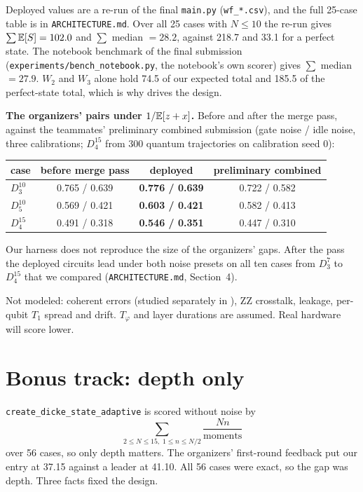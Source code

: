 \documentclass[11pt]{scrartcl}
\newcommand{\D}[2]{D^{#1}_{#2}}
\newcommand{\file}[1]{\texttt{\small #1}}
\begin{document}
Deployed values are a re-run of the final \file{main.py} (\file{wf\_*.csv}), and the full 25-case
table is in \file{ARCHITECTURE.md}. Over all 25 cases with $N\le10$ the re-run gives
$\sum\mathbb E[S]=102.0$ and $\sum$ median $=28.2$, against 218.7 and 33.1 for a perfect state. The
notebook benchmark of the final submission (\file{experiments/bench\_notebook.py}, the notebook's
own scorer) gives $\sum$ median $=27.9$. $W_2$ and $W_3$ alone hold 74.5 of our expected total and
185.5 of the perfect-state total, which is why  drives the design.

\textbf{The organizers' pairs under $1/\mathbb E[z+x]$.} Before and after the merge pass, against the
teammates' preliminary combined submission (gate noise / idle noise, three calibrations; $\D{15}4$
from 300 quantum trajectories on calibration seed 0):
\begin{center}\small
\begin{tabular}{lccc}
  \toprule
  case & before merge pass & deployed & preliminary combined\\
  \midrule
  $\D{10}3$ & 0.765 / 0.639 & \textbf{0.776 / 0.639} & 0.722 / 0.582\\
  $\D{10}5$ & 0.569 / 0.421 & \textbf{0.603 / 0.421} & 0.582 / 0.413\\
  $\D{15}4$ & 0.491 / 0.318 & \textbf{0.546 / 0.351} & 0.447 / 0.310\\
  \bottomrule
\end{tabular}
\end{center}
Our harness does not reproduce the size of the organizers' gaps. After the pass the deployed
circuits lead under both noise presets on all ten cases from $\D73$ to $\D{15}4$ that we compared
(\file{ARCHITECTURE.md}, Section~4).

\begin{remark}[Limits]
  Not modeled: coherent errors (studied separately in ), ZZ crosstalk, leakage,
  per-qubit $T_1$ spread and drift. $T_\varphi$ and layer durations are assumed.
  Real hardware will score lower.
\end{remark}

\section{Bonus track: depth only}\label{sec:bonus}

\file{create\_dicke\_state\_adaptive} is scored without noise by
\[
  \sum_{2\le N\le15,\;1\le n\le N/2}\frac{Nn}{\text{moments}}
\]
over 56 cases, so only depth matters. The organizers' first-round feedback put our entry at 37.15
against a leader at 41.10. All 56 cases were exact, so the gap was depth. Three facts fixed the
design.
\end{document}
